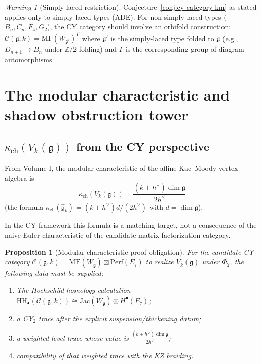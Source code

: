 \documentclass[11pt]{article}
\newtheorem{proposition}[theorem]{Proposition}
\theoremstyle{definition}
\theoremstyle{remark}
\newtheorem{warning}[theorem]{Warning}
\newcommand{\Perf}{\mathrm{Perf}}
\newcommand{\MF}{\mathrm{MF}}
\newcommand{\HH}{\mathrm{HH}}
\newcommand{\cC}{\mathcal{C}}
\newcommand{\frakg}{\mathfrak{g}}
\newcommand{\hv}{h^\vee}
\begin{document}
\begin{warning}[Simply-laced restriction]
\label{warn:simply-laced}
Conjecture~\ref{conj:cy-category-km} as stated applies only to
simply-laced types (ADE). For non-simply-laced types ($B_n, C_n, F_4, G_2$),
the CY category should involve an orbifold construction:
$\cC(\frakg, k) = \MF(W_{\frakg'})^{\Gamma}$ where $\frakg'$ is the
simply-laced type folded to $\frakg$ (e.g., $D_{n+1} \to B_n$ under
$\mathbb{Z}/2$-folding) and $\Gamma$ is the corresponding group of
diagram automorphisms.
\end{warning}

\section{The modular characteristic and shadow obstruction tower}
\label{sec:modular-shadow}

\subsection{$\kappa_{\mathrm{ch}}(V_k(\frakg))$ from the CY perspective}
\label{subsec:kappa-vk}

From Volume I, the modular characteristic of the affine Kac--Moody
vertex algebra is
\[
 \kappa_{\mathrm{ch}}(V_k(\frakg)) = \frac{(k + \hv) \dim \frakg}{2 \hv}
\]
(the formula $\kappa_{\mathrm{ch}}(\hat{\frakg}_k) = (k+\hv) d / (2\hv)$ with
$d = \dim \frakg$).

In the CY framework this formula is a matching target, not a consequence
of the naive Euler characteristic of the candidate matrix-factorization
category.

\begin{proposition}[Modular characteristic proof obligation]
\label{prop:kappa-check}
For the candidate CY category
$\cC(\frakg, k) = \MF(W_\frakg) \boxtimes \Perf(E_\tau)$ to realize
$V_k(\frakg)$ under $\Phi_2$, the following data must be supplied:
\begin{enumerate}[label=(\roman*)]
 \item The Hochschild homology calculation
 $\HH_\bullet(\cC(\frakg, k)) \cong \mathrm{Jac}(W_\frakg) \otimes H^\bullet(E_\tau)$;
 \item a CY$_2$ trace after the explicit suspension/thickening datum;
 \item a weighted level trace whose value is
 $\frac{(k+\hv)\dim\frakg}{2\hv}$;
 \item compatibility of that weighted trace with the KZ braiding.
\end{enumerate}
\end{proposition}
\end{document}
